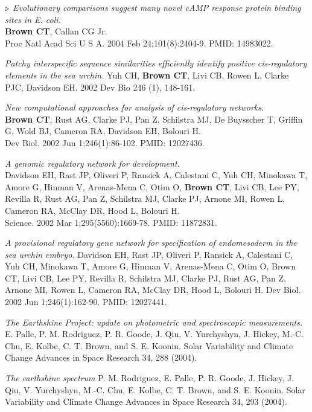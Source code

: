 \documentclass[margin,line]{resume}
\begin{document}
\begin{resume}
\newpage

{\color{red} ${\bf \triangleright}$}
{\em Evolutionary comparisons suggest
many novel cAMP response protein binding sites in {\em E. coli}.}\\
{\bf Brown CT}, Callan CG Jr.\\
Proc Natl Acad Sci U S A. 2004 Feb 24;101(8):2404-9.  PMID: 14983022.

{\em Patchy interspecific sequence similarities efficiently identify positive cis-regulatory elements in the sea urchin.}
Yuh CH, {\bf Brown CT}, Livi CB, Rowen L, Clarke PJC, Davidson EH.
2002 Dev Bio 246 (1), 148-161.

  {\em New
computational approaches for analysis of {\em cis}-regulatory networks.}  \\
{\bf Brown CT}, Rust AG, Clarke PJ, Pan Z, Schilstra MJ, De Buysscher
T, Griffin G, Wold BJ, Cameron RA, Davidson EH, Bolouri H.\\
Dev Biol. 2002 Jun 1;246(1):86-102.  PMID: 12027436.

{\em A genomic
regulatory network for development.}\\
Davidson EH, Rast JP, Oliveri P, Ransick A, Calestani C, Yuh CH,
Minokawa T, Amore G, Hinman V, Arenas-Mena C, Otim O, {\bf Brown CT}, Livi
CB, Lee PY, Revilla R, Rust AG, Pan Z, Schilstra MJ, Clarke PJ, Arnone
MI, Rowen L, Cameron RA, McClay DR, Hood L, Bolouri H.
\\Science. 2002 Mar
1;295(5560):1669-78.  PMID: 11872831.

{\em A provisional regulatory gene network for specification of endomesoderm in the sea urchin embryo.}
Davidson EH, Rast JP, Oliveri P, Ransick A, Calestani C, Yuh CH, Minokawa T, Amore G, Hinman V, Arenas-Mena C, Otim O, Brown CT, Livi CB, Lee PY, Revilla R, Schilstra MJ, Clarke PJ, Rust AG, Pan Z, Arnone MI, Rowen L, Cameron RA, McClay DR, Hood L, Bolouri H.
Dev Biol. 2002 Jun 1;246(1):162-90.
PMID: 12027441.

{\em The Earthshine Project: update on photometric and spectroscopic measurements.}
 E. Palle, P. M. Rodriguez, P. R. Goode, J. Qiu, V. Yurchyshyn, J. Hickey, M.-C. Chu, E. Kolbe, C. T. Brown, and S. E. Koonin.
Solar Variability and Climate Change Advances in Space Research 34, 288 (2004).

{\em The earthshine spectrum}
P. M. Rodriguez, E. Palle, P. R. Goode, J. Hickey, J. Qiu, V. Yurchyshyn, M.-C. Chu, E. Kolbe, C. T. Brown, and S. E. Koonin.
Solar Variability and Climate Change Advances in Space Research 34, 293 (2004).


\end{resume}
\end{document}
